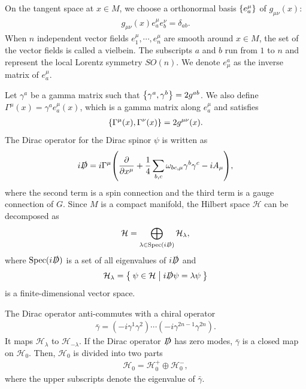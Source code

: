 \documentclass[11pt]{article}
\begin{document}
On the tangent space at $x \in M$, we choose a orthonormal basis $\qty{e^\mu_a}$ of $g_{\mu\nu }(x)$:
\begin{align}
    g_{\mu \nu}(x) e^\mu_a e^\nu_b= \delta_{ab}.
\end{align}
When $n$ independent vector fields $e^\mu_1,\cdots,e^\mu_n $ are smooth around $x \in M$, the set of the vector fields is called a vielbein. The subscripts $a$ and $b$ run from $1$ to $n$ and represent the local Lorentz symmetry $SO(n)$. We denote $e^a_\mu$ as the inverse matrix of $e^\mu_a $. 

Let $\gamma^a$ be a gamma matrix such that $\qty{\gamma^a, \gamma^b }=2 g^{a b}$. We also define $\Gamma^\mu(x)= \gamma^a e_a^\mu(x)$, which is a gamma matrix along $e_a^\mu$ and satisfies
\begin{align}
    \qty{\Gamma^\mu (x) , \Gamma^\nu(x)}=2 g^{\mu \nu}(x).
\end{align}
The Dirac operator for the Dirac spinor $\psi$ is written as
\begin{align}
    i\slashed{D} = i\Gamma^\mu \qty(\pdv{}{x^\mu} + \frac{1}{4} \sum_{b,c} \omega_{bc,\mu} \gamma^b \gamma^c -i A_\mu ) ,
\end{align}
where the second term is a spin connection and the third term is a gauge connection of $G$. Since $M$ is a compact manifold, the Hilbert space $\mathcal{H}$ can be decomposed as
\begin{align}
 \mathcal{H}=\bigoplus_{\lambda \in \text{Spec}(i\slashed{D})} \mathcal{H}_\lambda,
\end{align}
where $\text{Spec}(i\slashed{D})$ is a set of all eigenvalues of $i\slashed{D}$ and 
\begin{align}
    \mathcal{H}_\lambda= \Set{ \psi \in \mathcal{H} |i \slashed{D} \psi= \lambda \psi }
\end{align}
is a finite-dimensional vector space.

The Dirac operator anti-commutes with a chiral operator
\begin{align}
    \bar{\gamma}=(-i\gamma^1 \gamma^2) \cdots (-i\gamma^{2n-1} \gamma^{2n}). 
\end{align}
It maps $\mathcal{H}_\lambda$ to $\mathcal{H}_{-\lambda}$. If the Dirac operator $\slashed{D}$ has zero modes, $\bar{\gamma}$ is a closed map on $\mathcal{H}_0$. Then, $\mathcal{H}_0$ is divided into two parts
\begin{align}
    \mathcal{H}_0= \mathcal{H}^+_0 \oplus \mathcal{H}^-_0, 
\end{align}
where the upper subscripts denote the eigenvalue of $\bar{\gamma}$.
\end{document}
